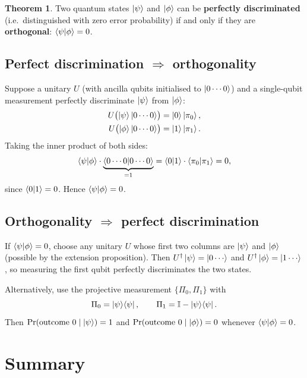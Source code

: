 \documentclass[11pt]{article}
\theoremstyle{definition}
\newtheorem{theorem}{Theorem}[section]
\begin{document}
\begin{theorem}
Two quantum states $\ket{\psi}$ and $\ket{\phi}$ can be \textbf{perfectly discriminated} (i.e.\ distinguished with zero error probability) if and only if they are \textbf{orthogonal}: $\braket{\psi}{\phi}=0$.
\end{theorem}

\subsection{Perfect discrimination $\Rightarrow$ orthogonality}

Suppose a unitary $U$ (with ancilla qubits initialised to $\ket{0\cdots 0}$) and a single-qubit measurement perfectly discriminate $\ket{\psi}$ from $\ket{\phi}$:
\begin{align}
    U\bigl(\ket{\psi}\ket{0\cdots 0}\bigr) &= \ket{0}\ket{\pi_0}, \\
    U\bigl(\ket{\phi}\ket{0\cdots 0}\bigr) &= \ket{1}\ket{\pi_1}.
\end{align}
Taking the inner product of both sides:
\[
    \braket{\psi}{\phi}\cdot\underbrace{\braket{0\cdots 0}{0\cdots 0}}_{=1}
    = \braket{0}{1}\cdot\braket{\pi_0}{\pi_1}
    = 0,
\]
since $\braket{0}{1}=0$.  Hence $\braket{\psi}{\phi}=0$.

\subsection{Orthogonality $\Rightarrow$ perfect discrimination}

If $\braket{\psi}{\phi}=0$, choose any unitary $U$ whose first two columns are $\ket{\psi}$ and $\ket{\phi}$ (possible by the extension proposition).  Then $U^\dagger\ket{\psi}=\ket{0\cdots}$ and $U^\dagger\ket{\phi}=\ket{1\cdots}$, so measuring the first qubit perfectly discriminates the two states.

Alternatively, use the projective measurement $\{\Pi_0,\Pi_1\}$ with
\[
    \Pi_0 = \ket{\psi}\!\bra{\psi}, \qquad \Pi_1 = \mathbb{I}-\ket{\psi}\!\bra{\psi}.
\]
Then $\Pr(\text{outcome }0\mid\ket{\psi})=1$ and $\Pr(\text{outcome }0\mid\ket{\phi})=0$ whenever $\braket{\psi}{\phi}=0$.

\section{Summary}
\end{document}
